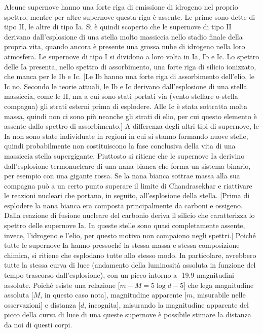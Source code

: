 \documentclass[12pt,a4paper,fleqn,draft]{article}
\begin{document}
Alcune supernove hanno una forte riga di emissione di idrogeno nel proprio
spettro, mentre per altre supernove questa riga è assente. Le prime sono dette
di tipo II, le altre di tipo Ia. Si è quindi scoperto che le supernove di tipo
II derivano dall'esplosione di una stella molto massiccia nello stadio finale
della propria vita, quando ancora è presente una grossa nube di idrogeno nella
loro atmosfera. Le supernove di tipo I si dividono a loro volta in Ia, Ib e
Ic. Lo spettro delle Ia presenta, nello spettro di assorbimento, una forte riga
di silicio ionizzato, che manca per le Ib e Ic. [Le Ib hanno una forte riga di
assorbimento dell'elio, le Ic no. Secondo le teorie attuali, le Ib e Ic derivano
dall'esplosione di una stella massiccia, come le II, ma a cui sono stati portati
via (vento stellare o stella compagna) gli strati esterni prima di
esplodere. Alle Ic è stata sottratta molta massa, quindi non ci sono più neanche
gli strati di elio, per cui questo elemento è assente dallo spettro di
assorbimento.] A differenza degli altri tipi di supernove, le Ia non sono state
individuate in regioni in cui si stanno formando nuove stelle, quindi
probabilmente non costituiscono la fase conclusiva della vita di una massiccia
stella supergigante. Piuttosto si ritiene che le supernove Ia derivino
dall'esplosione termonucleare di una nana bianca che forma un sistema binario,
per esempio con una gigante rossa. Se la nana bianca sottrae massa alla sua
compagna può a un certo punto superare il limite di Chandrasekhar e riattivare
le reazioni nucleari che portano, in seguito, all'esplosione della
stella. [Prima di esplodere la nana bianca era composta principalmente da
carboni e ossigeno. Dalla reazione di fusione nucleare del carbonio deriva il
silicio che caratterizza lo spettro delle supernove Ia. In queste stelle sono
quasi completamente assente, invece, l'idrogeno e l'elio, per questo motivo non
compaiono negli spettri.] Poiché tutte le supernove Ia hanno pressoché la stessa
massa e stessa composizione chimica, si ritiene che esplodano tutte allo stesso
modo. In particolare, avrebbero tutte la stessa curva di luce (andamento della
luminosità assoluta in funzione del tempo trascorso dall'esplosione), con un
picco intorno a -19.9 magnitudini assolute. Poiché esiste una relazione
[$m-M=5\log d - 5$] che lega magnitudine assoluta [$M$, in questo caso nota],
magnitudine apparente [$m$, misurabile nelle osservazioni] e distanza [$d$,
incognita], misurando la magnitudine apparente del picco della curva di luce di
una queste supernove è possibile stimare la distanza da noi di questi corpi.
\end{document}

